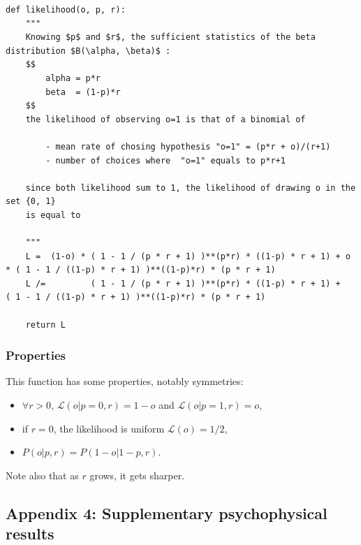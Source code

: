 \documentclass[12pt,english]{article}%
\newcommand{\Ll}{\mathcal{L}}
\newcommand{\seeApp}[1]{Appendix~\ref{app:#1}}
\begin{document}
\begin{lstlisting}
def likelihood(o, p, r):
    """
    Knowing $p$ and $r$, the sufficient statistics of the beta distribution $B(\alpha, \beta)$ :
    $$
        alpha = p*r
        beta  = (1-p)*r
    $$
    the likelihood of observing o=1 is that of a binomial of

        - mean rate of chosing hypothesis "o=1" = (p*r + o)/(r+1)
        - number of choices where  "o=1" equals to p*r+1

    since both likelihood sum to 1, the likelihood of drawing o in the set {0, 1}
    is equal to

    """
    L =  (1-o) * ( 1 - 1 / (p * r + 1) )**(p*r) * ((1-p) * r + 1) + o * ( 1 - 1 / ((1-p) * r + 1) )**((1-p)*r) * (p * r + 1)
    L /=         ( 1 - 1 / (p * r + 1) )**(p*r) * ((1-p) * r + 1) +     ( 1 - 1 / ((1-p) * r + 1) )**((1-p)*r) * (p * r + 1)

    return L
\end{lstlisting}

\subsubsection{Properties}
This function has some properties, notably symmetries:
	\begin{itemize}
		\item  $\forall r >0$, $\Ll(o|p=0, r)=1-o$ and $\Ll(o|p=1, r)=o$,
		\item if $r=0$, the likelihood is uniform $\Ll(o)=1/2$,
		\item $P(o | p, r)=P(1-o | 1-p, r)$.
	\end{itemize}

Note also that as $r$ grows, it gets sharper.


\subsection{Appendix 4: Supplementary psychophysical results}
\label{app:results_psycho}

{\tiny
\printbibliography
}
\end{document}
